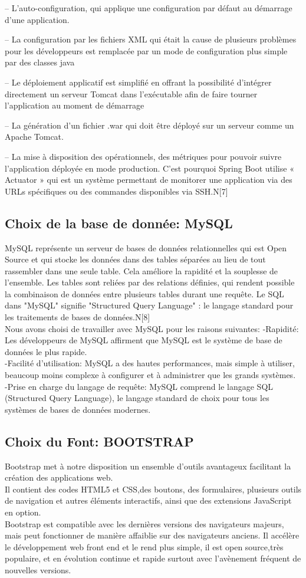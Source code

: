 \documentclass[a4paper,12pt,oneside]{report}
\begin{document}
– L'auto-configuration, qui applique une configuration par défaut au démarrage d’une application.

– La configuration par les fichiers XML qui était la cause de plusieurs problèmes pour les développeurs est remplacée par un mode de configuration plus simple par des classes java

– Le déploiement applicatif est simplifié en offrant la possibilité d'intégrer
directement un serveur Tomcat dans l'exécutable afin de faire tourner
l'application au moment de démarrage

– La génération d'un fichier .war qui doit être déployé sur un serveur
comme un Apache Tomcat.

– La mise à disposition des opérationnels, des métriques pour pouvoir
suivre l'application déployée en mode production. C'est pourquoi Spring
Boot utilise « Actuator » qui est un système permettant de monitorer une application via des URLs spécifiques ou des commandes disponibles via SSH.N[7]
\subsection{ Choix de la base de donnée: MySQL}
MySQL représente un serveur de bases de données relationnelles qui est Open Source et qui stocke les données dans des tables séparées au lieu de tout rassembler dans une seule table. Cela améliore la rapidité et la souplesse de l'ensemble. Les tables sont reliées par des relations définies, qui rendent possible la combinaison de données entre plusieurs tables durant une requête. Le SQL dans "MySQL" signifie "Structured Query Language" : le langage standard pour les traitements de bases de données.N[8] \\
Nous avons choisi de travailler avec MySQL pour les raisons suivantes:
-Rapidité: 
Les développeurs de MySQL affirment que MySQL est le système de base de données le plus rapide.\\
-Facilité d'utilisation: MySQL a des hautes performances, mais simple à utiliser, beaucoup moins complexe à configurer et à administrer que les grands systèmes.\\
-Prise en charge du langage de requête: MySQL comprend le langage SQL (Structured Query Language), le langage standard de choix pour tous les systèmes de bases de données modernes.


\subsection{ Choix du Font: BOOTSTRAP} 
Bootstrap met à notre disposition un ensemble d'outils avantageux facilitant la création des applications web.\\
Il contient des codes HTML5 et CSS,des boutons, des formulaires, plusieurs outils de
navigation et autres éléments interactifs, ainsi que des extensions JavaScript en option.\\ Bootstrap est compatible avec les dernières versions des navigateurs majeurs, mais peut fonctionner de manière affaiblie sur des navigateurs anciens. Il accélère  le développement web front end et le rend plus simple, il est open source,très populaire, et en évolution continue et rapide surtout
avec l'avènement fréquent de nouvelles versions.
\end{document}

